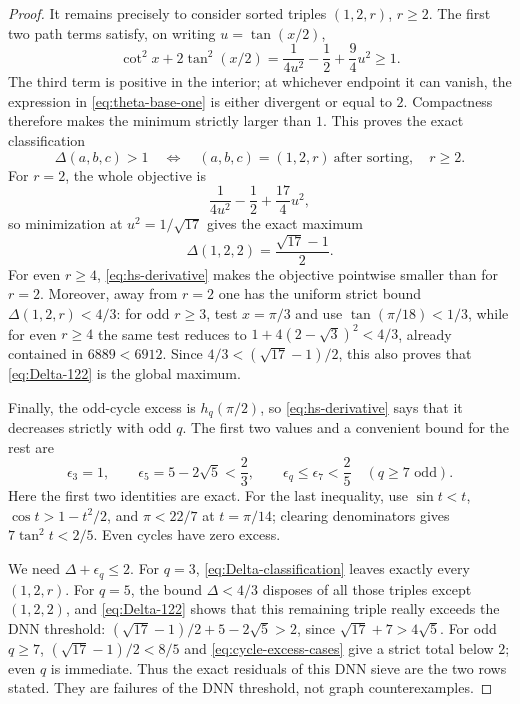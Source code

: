 \documentclass[11pt]{article}
\theoremstyle{remark}
\begin{document}
\begin{proof}
It remains precisely to consider sorted triples $(1,2,r)$, $r\geq2$.
The first two path terms satisfy, on writing $u=\tan(x/2)$,
\begin{equation}\label{eq:theta-base-one}
 \cot^2x+2\tan^2(x/2)
 =\frac{1}{4u^2}-\frac12+\frac94u^2\geq1.
\end{equation}
The third term is positive in the interior; at whichever endpoint it can
vanish, the expression in \eqref{eq:theta-base-one} is either divergent or
equal to $2$.  Compactness therefore makes the minimum strictly larger than
$1$.  This proves the exact classification
\begin{equation}\label{eq:Delta-classification}
 \Delta(a,b,c)>1
 \quad\Longleftrightarrow\quad
 (a,b,c)=(1,2,r)\ \text{after sorting},\quad r\geq2.
\end{equation}
For $r=2$, the whole objective is
\[
 \frac{1}{4u^2}-\frac12+\frac{17}{4}u^2,
\]
so minimization at $u^2=1/\sqrt{17}$ gives the exact maximum
\begin{equation}\label{eq:Delta-122}
 \Delta(1,2,2)=\frac{\sqrt{17}-1}{2}.
\end{equation}
For even $r\geq4$, \eqref{eq:hs-derivative} makes the objective pointwise
smaller than for $r=2$.  Moreover, away from $r=2$ one has the uniform strict
bound $\Delta(1,2,r)<4/3$: for odd $r\geq3$, test $x=\pi/3$ and use
$\tan(\pi/18)<1/3$, while for even $r\geq4$ the same test reduces to
$1+4(2-\sqrt3)^2<4/3$, already contained in $6889<6912$.  Since
$4/3<(\sqrt{17}-1)/2$, this also proves that \eqref{eq:Delta-122} is the
global maximum.

Finally, the odd-cycle excess is $h_q(\pi/2)$, so
\eqref{eq:hs-derivative} says that it decreases strictly with odd $q$.  The
first two values and a convenient bound for the rest are
\begin{equation}\label{eq:cycle-excess-cases}
 \epsilon_3=1,
 \qquad \epsilon_5=5-2\sqrt5<\frac23,
 \qquad \epsilon_q\leq\epsilon_7<\frac25\quad(q\geq7\text{ odd}).
\end{equation}
Here the first two identities are exact.  For the last inequality, use
$\sin t<t$, $\cos t>1-t^2/2$, and $\pi<22/7$ at $t=\pi/14$; clearing
denominators gives $7\tan^2t<2/5$.  Even cycles have zero excess.

We need $\Delta+\epsilon_q\leq2$.  For $q=3$,
\eqref{eq:Delta-classification} leaves exactly every $(1,2,r)$.  For $q=5$,
the bound $\Delta<4/3$ disposes of all those triples except $(1,2,2)$, and
\eqref{eq:Delta-122} shows that this remaining triple really exceeds the DNN
threshold: $(\sqrt{17}-1)/2+5-2\sqrt5>2$, since
$\sqrt{17}+7>4\sqrt5$.  For odd $q\geq7$,
$(\sqrt{17}-1)/2<8/5$ and \eqref{eq:cycle-excess-cases} give a strict total
below $2$; even $q$ is immediate.  Thus the exact residuals of this DNN sieve
are the two rows stated.  They are failures of the DNN threshold, not graph
counterexamples.
\end{proof}
\end{document}
